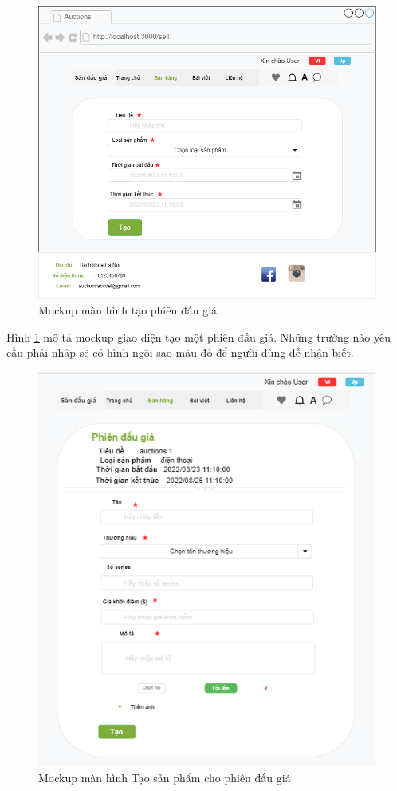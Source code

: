 \documentclass[../DoAn.tex]{subfiles}
\begin{document}
\begin{figure}[H]
    \centering
    \includegraphics[width=0.75\linewidth,height=9.7cm]{Hinhve/createauction.png}
    \caption{Mockup màn hình tạo phiên đấu giá}
    \label{fig:Fig49}
\end{figure}
Hình \ref{fig:Fig49} mô tả mockup giao diện tạo một phiên đấu giá. Những trường nào yêu cầu phải nhập sẽ có hình ngôi sao màu đỏ để người dùng dễ nhận biết.
\newpage
\begin{figure}[H]
    \centering
    \includegraphics[width=0.75\linewidth,height=13.08cm]{Hinhve/itemcreate.png}
    \caption{Mockup màn hình Tạo sản phẩm cho phiên đấu giá}
    \label{fig:Fig410}
\end{figure}
\end{document}
